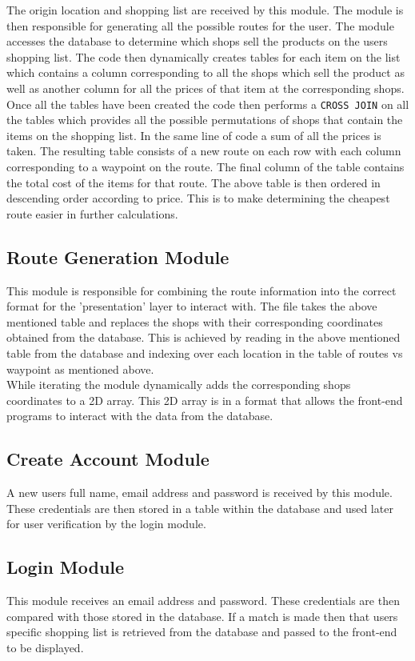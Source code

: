 \documentclass[10pt, a4paper, onecolumn]{scrartcl}
\begin{document}
			The origin location and shopping list are received by this module. The module is then responsible for generating all the possible routes for the user. The module accesses the database to determine which shops sell the products on the users shopping list. The code then dynamically creates tables for each item on the list which contains a column corresponding to all the shops which sell the product as well as another column for all the prices of that item at the corresponding shops. \\
						
			Once all the tables have been created the code then performs a \texttt{CROSS JOIN} on all the tables which provides all the possible permutations of shops that contain the items on the shopping list. In the same line of code a sum of all the prices is taken. The resulting table consists of a new route on each row with each column corresponding to a waypoint on the route. The final column of the table contains the total cost of the items for that route. The above table is then ordered in descending order according to price. This is to make determining the cheapest route easier in further calculations.
			
		\subsection{Route Generation Module}
				
			This module is responsible for combining the route information into the correct format for the 'presentation' layer to interact with. The file takes the above mentioned table and replaces the shops with their corresponding coordinates obtained from the database. This is achieved by reading in the above mentioned table from the database and indexing over each location in the table of routes vs waypoint as mentioned above. \\
					
			While iterating the module dynamically adds the corresponding shops coordinates to a 2D array. This 2D array is in a format that allows the front-end programs to interact with the data from the database.
			
		\subsection{Create Account Module}
			
			A new users full name, email address and password is received by this module. These credentials are then stored in a table within the database and used later for user verification by the login module.
			
		\subsection{Login Module}
			 
			This module receives an email address and password. These credentials are then compared with those stored in the database. If a match is made then that users specific shopping list is retrieved from the database and passed to the front-end to be displayed.
\end{document}
